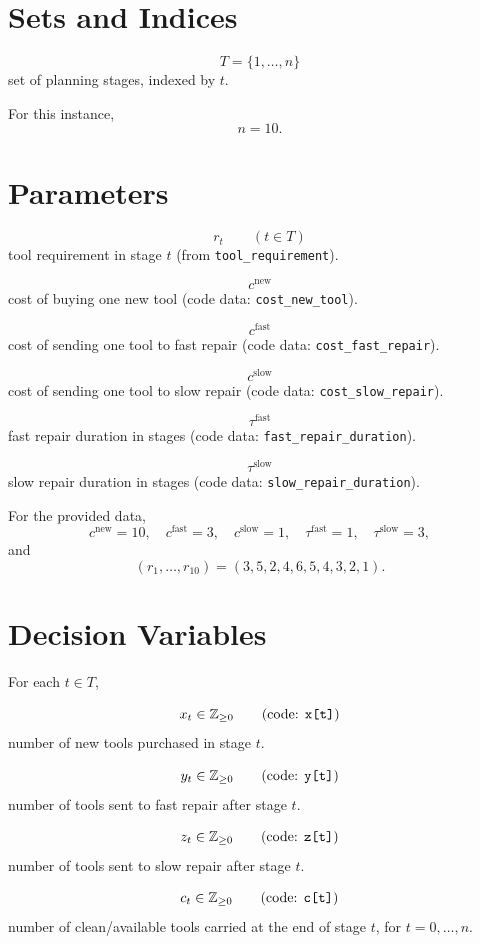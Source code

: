 \section*{Sets and Indices}

\[
T = \{1,\dots,n\}
\]
set of planning stages, indexed by \(t\).

For this instance,
\[
n=10.
\]

\section*{Parameters}

\[
r_t \qquad (t \in T)
\]
tool requirement in stage \(t\) (from \texttt{tool\_requirement}).

\[
c^{\text{new}}
\]
cost of buying one new tool (code data: \texttt{cost\_new\_tool}).

\[
c^{\text{fast}}
\]
cost of sending one tool to fast repair (code data: \texttt{cost\_fast\_repair}).

\[
c^{\text{slow}}
\]
cost of sending one tool to slow repair (code data: \texttt{cost\_slow\_repair}).

\[
\tau^{\text{fast}}
\]
fast repair duration in stages (code data: \texttt{fast\_repair\_duration}).

\[
\tau^{\text{slow}}
\]
slow repair duration in stages (code data: \texttt{slow\_repair\_duration}).

For the provided data,
\[
c^{\text{new}}=10,\quad
c^{\text{fast}}=3,\quad
c^{\text{slow}}=1,\quad
\tau^{\text{fast}}=1,\quad
\tau^{\text{slow}}=3,
\]
and
\[
(r_1,\dots,r_{10})=(3,5,2,4,6,5,4,3,2,1).
\]

\section*{Decision Variables}

For each \(t \in T\),

\[
x_t \in \mathbb{Z}_{\ge 0}
\qquad \text{(code: \texttt{x[t]})}
\]
number of new tools purchased in stage \(t\).

\[
y_t \in \mathbb{Z}_{\ge 0}
\qquad \text{(code: \texttt{y[t]})}
\]
number of tools sent to fast repair after stage \(t\).

\[
z_t \in \mathbb{Z}_{\ge 0}
\qquad \text{(code: \texttt{z[t]})}
\]
number of tools sent to slow repair after stage \(t\).

\[
c_t \in \mathbb{Z}_{\ge 0}
\qquad \text{(code: \texttt{c[t]})}
\]
number of clean/available tools carried at the end of stage \(t\), for \(t=0,\dots,n\).


